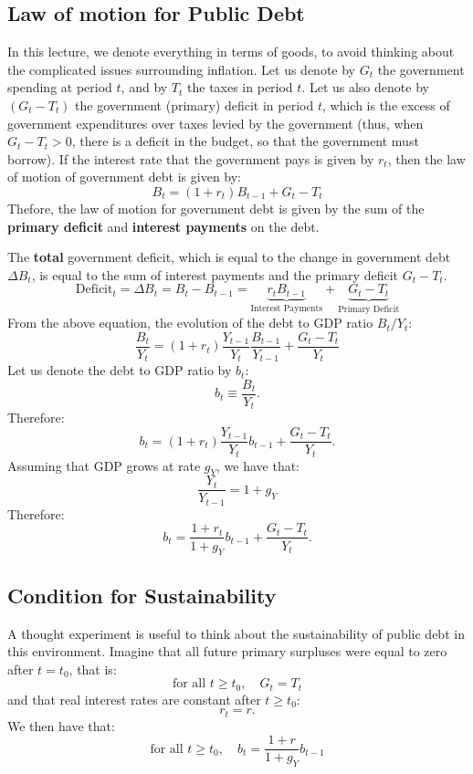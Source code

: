 \documentclass[]{book}
\theoremstyle{definition}
\theoremstyle{definition}
\theoremstyle{definition}
\theoremstyle{remark}
\begin{document}
\subsection{Law of motion for Public
Debt}\label{law-of-motion-for-public-debt}

In this lecture, we denote everything in terms of goods, to avoid
thinking about the complicated issues surrounding inflation. Let us
denote by \(G_t\) the government spending at period \(t\), and by
\(T_t\) the taxes in period \(t\). Let us also denote by \((G_t-T_t)\)
the government (primary) deficit in period \(t\), which is the excess of
government expenditures over taxes levied by the government (thus, when
\(G_t-T_t>0\), there is a deficit in the budget, so that the government
must borrow). If the interest rate that the government pays is given by
\(r_t\), then the law of motion of government debt is given by:
\[B_{t}=(1+r_t)B_{t-1}+G_{t}-T_{t}\] Thefore, the law of motion for
government debt is given by the sum of the \textbf{primary deficit} and
\textbf{interest payments} on the debt.

The \textbf{total} government deficit, which is equal to the change in
government debt \(\Delta B_{t}\), is equal to the sum of interest
payments and the primary deficit \(G_{t}-T_{t}\).
\[\text{Deficit}_{t}=\Delta B_{t}=B_{t}-B_{t-1}=\underbrace{r_tB_{t-1}}_{\text{Interest Payments}}+\underbrace{G_{t}-T_{t}}_{\text{Primary Deficit}}\]
From the above equation, the evolution of the debt to GDP ratio
\(B_{t}/Y_{t}\):
\[\frac{B_{t}}{Y_{t}}=(1+r_t)\frac{Y_{t-1}}{Y_{t}}\frac{B_{t-1}}{Y_{t-1}}+\frac{G_{t}-T_{t}}{Y_{t}}\]
Let us denote the debt to GDP ratio by \(b_t\):
\[b_t \equiv \frac{B_t}{Y_t}.\] Therefore:
\[b_t = (1+r_t)\frac{Y_{t-1}}{Y_{t}}b_{t-1}+\frac{G_{t}-T_{t}}{Y_{t}}.\]
Assuming that GDP grows at rate \(g_Y\), we have that:
\[\frac{Y_t}{Y_{t-1}}=1+g_Y\] Therefore:
\[\boxed{b_t = \frac{1+r_t}{1+g_Y}b_{t-1}+\frac{G_{t}-T_{t}}{Y_{t}}}.\]

\subsection{Condition for
Sustainability}\label{condition-for-sustainability}

A thought experiment is useful to think about the sustainability of
public debt in this environment. Imagine that all future primary
surpluses were equal to zero after \(t=t_0\), that is:
\[\text{for all }t\geq t_{0},\quad G_{t}=T_{t}\] and that real interest
rates are constant after \(t \geq t_0\): \[r_t=r.\] We then have that:
\[\text{for all }t\geq t_{0},\quad b_t = \frac{1+r}{1+g_Y}b_{t-1}\]
\end{document}
